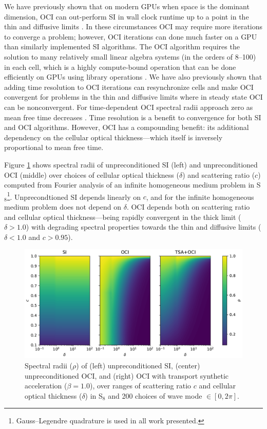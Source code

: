 We have previously shown that on modern GPUs when space is the dominant dimension, OCI can out-perform SI in wall clock runtime up to a point in the thin and diffusive limits \cite{morgan2023oci}.
In these circumstances OCI may require more iterations to converge a problem; however, OCI iterations can done much faster on a GPU than similarly implemented SI algorithms.
The OCI algorithm requires the solution to many relatively small linear algebra systems (in the orders of 8--100) in each cell, which is a highly compute-bound operation that can be done efficiently on GPUs using library operations \cite{morgan_2025_oci}.
We have also previously shown that adding time resolution to OCI iterations can resynchronize cells and make OCI convergent for problems in the thin and diffusive limits where in steady state OCI can be nonconvergent.
For time-dependent OCI spectral radii approach zero as mean free time decreases \cite{morgan_2025_oci}.
Time resolution is a benefit to convergence for both SI and OCI algorithms.
However, OCI has a compounding benefit: its additional dependency on the cellular optical thickness---which itself is inversely proportional to mean free time.

Figure \ref{fig:ss_spec_rads} shows spectral radii of unpreconditioned SI (left) and unpreconditioned OCI (middle) over choices of cellular optical thickness ($\delta$) and scattering ratio ($c$) computed from Fourier analysis of an infinite homogeneous medium problem in S$_8$\footnote{Gauss--Legendre quadrature is used in all work presented.}.
Unprecondtioned SI depends linearly on $c$, and for the infinite homogeneous medium problem does not depend on $\delta$.
OCI depends both on scattering ratio and cellular optical thickness---being rapidly convergent in the thick limit ($\delta>1.0$) with degrading spectral properties towards the thin and diffusive limits ($\delta<1.0$ and $c>0.95$).

\begin{figure}
    \centering
    \includegraphics[width=\linewidth]{figures/smm_paper/ss_specrads.pdf}
    \caption{Spectral radii ($\rho$) of (left) unpreconditioned SI, (center) unpreconditioned OCI, and (right) OCI with transport synthetic acceleration ($\beta=1.0$), over ranges of scattering ratio $c$ and cellular optical thickness ($\delta$) in S$_8$ and 200 choices of wave mode $\in[0,2\pi]$. }
    \label{fig:ss_spec_rads}
\end{figure}

